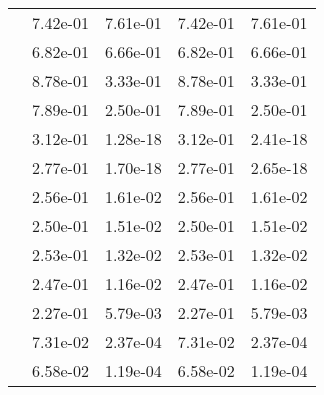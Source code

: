 \begin{table}
\begin{tabular}{c|cc|cc|}
\multicolumn{1}{|c|}{} & \multicolumn{1}{|c|}{  7.42e-01} & \multicolumn{1}{|c|}{  7.61e-01} & \multicolumn{1}{|c|}{  7.42e-01} & \multicolumn{1}{|c|}{  7.61e-01} \\ 
\multicolumn{1}{|c|}{} & \multicolumn{1}{|c|}{  6.82e-01} & \multicolumn{1}{|c|}{  6.66e-01} & \multicolumn{1}{|c|}{  6.82e-01} & \multicolumn{1}{|c|}{  6.66e-01} \\ 
\multicolumn{1}{|c|}{} & \multicolumn{1}{|c|}{  8.78e-01} & \multicolumn{1}{|c|}{  3.33e-01} & \multicolumn{1}{|c|}{  8.78e-01} & \multicolumn{1}{|c|}{  3.33e-01} \\ 
\multicolumn{1}{|c|}{} & \multicolumn{1}{|c|}{  7.89e-01} & \multicolumn{1}{|c|}{  2.50e-01} & \multicolumn{1}{|c|}{  7.89e-01} & \multicolumn{1}{|c|}{  2.50e-01} \\ 
\multicolumn{1}{|c|}{} & \multicolumn{1}{|c|}{  3.12e-01} & \multicolumn{1}{|c|}{  1.28e-18} & \multicolumn{1}{|c|}{  3.12e-01} & \multicolumn{1}{|c|}{  2.41e-18} \\ 
\multicolumn{1}{|c|}{} & \multicolumn{1}{|c|}{  2.77e-01} & \multicolumn{1}{|c|}{  1.70e-18} & \multicolumn{1}{|c|}{  2.77e-01} & \multicolumn{1}{|c|}{  2.65e-18} \\ 
\multicolumn{1}{|c|}{} & \multicolumn{1}{|c|}{  2.56e-01} & \multicolumn{1}{|c|}{  1.61e-02} & \multicolumn{1}{|c|}{  2.56e-01} & \multicolumn{1}{|c|}{  1.61e-02} \\ 
\multicolumn{1}{|c|}{} & \multicolumn{1}{|c|}{  2.50e-01} & \multicolumn{1}{|c|}{  1.51e-02} & \multicolumn{1}{|c|}{  2.50e-01} & \multicolumn{1}{|c|}{  1.51e-02} \\ 
\multicolumn{1}{|c|}{} & \multicolumn{1}{|c|}{  2.53e-01} & \multicolumn{1}{|c|}{  1.32e-02} & \multicolumn{1}{|c|}{  2.53e-01} & \multicolumn{1}{|c|}{  1.32e-02} \\ 
\multicolumn{1}{|c|}{} & \multicolumn{1}{|c|}{  2.47e-01} & \multicolumn{1}{|c|}{  1.16e-02} & \multicolumn{1}{|c|}{  2.47e-01} & \multicolumn{1}{|c|}{  1.16e-02} \\ 
\multicolumn{1}{|c|}{} & \multicolumn{1}{|c|}{  2.27e-01} & \multicolumn{1}{|c|}{  5.79e-03} & \multicolumn{1}{|c|}{  2.27e-01} & \multicolumn{1}{|c|}{  5.79e-03} \\ 
\multicolumn{1}{|c|}{} & \multicolumn{1}{|c|}{  7.31e-02} & \multicolumn{1}{|c|}{  2.37e-04} & \multicolumn{1}{|c|}{  7.31e-02} & \multicolumn{1}{|c|}{  2.37e-04} \\ 
\multicolumn{1}{|c|}{} & \multicolumn{1}{|c|}{  6.58e-02} & \multicolumn{1}{|c|}{  1.19e-04} & \multicolumn{1}{|c|}{  6.58e-02} & \multicolumn{1}{|c|}{  1.19e-04} \\ 

\end{tabular}
\end{table}
